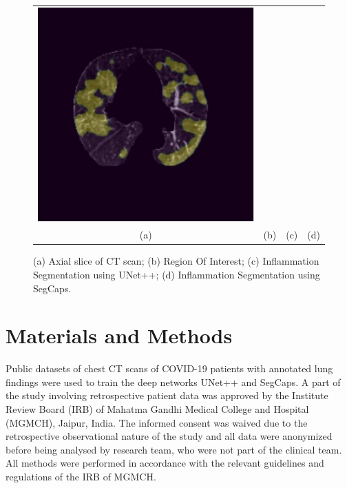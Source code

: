 \begin{figure}
\begin{tabular}{c c c c}
    \includegraphics[scale=0.47]{images/Result3-27-capsnet.jpg}\\
    (a) & (b) & (c) & (d)
\end{tabular}
\caption{{(a)} Axial slice of CT scan; {(b)} Region Of Interest; {(c)} Inflammation Segmentation using UNet++; (d) Inflammation Segmentation using SegCaps.}
\label{Fig : Main Results}
\end{figure}




\section{{Materials and Methods}}
\label{sec:MM}

Public datasets of chest CT scans of COVID-19 patients with annotated lung findings were used to train the deep networks UNet++ and SegCaps. A part of the study involving retrospective patient data was approved by the Institute Review Board (IRB) of Mahatma Gandhi Medical College and Hospital (MGMCH), Jaipur, India. The informed consent was waived due to the retrospective observational nature of the study and all data were anonymized before being analysed by research team, who were not part of the clinical team. All methods were performed in accordance with the relevant guidelines and regulations of the IRB of MGMCH.

